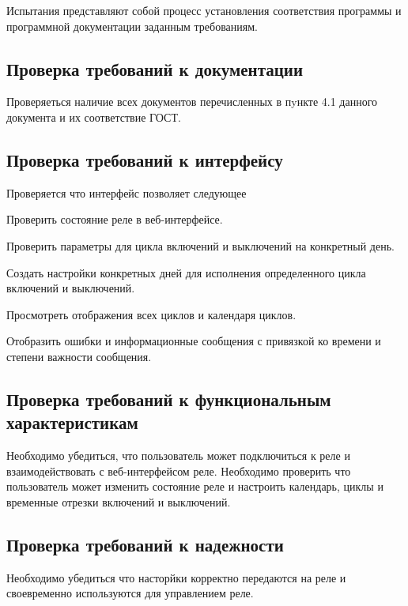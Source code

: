 Испытания представляют собой процесс установления соответствия программы и
программной документации заданным требованиям.

\subsection{Проверка требований к документации}
Проверяеться наличие всех документов перечисленных в пyнкте 4.1 данного документа и их соответствие ГОСТ.

\subsection{Проверка требований к интерфейсу}
Проверяется что интерфейс позволяет следующее
\begin{my_enumerate}
\item Проверить состояние реле в веб-интерфейсе.
\item Проверить параметры для цикла включений и выключений на конкретный день.
\item Создать настройки конкретных дней для исполнения определенного цикла включений и выключений.
\item Просмотреть отображения всех циклов и календаря циклов.
\item Отобразить ошибки и информационные сообщения с привязкой ко времени и степени важности сообщения.
\end{my_enumerate}


\subsection{Проверка требований к функциональным характеристикам}
Необходимо убедиться, что пользователь может подключиться к реле и взаимодействовать с веб-интерфейсом реле. Необходимо проверить что пользователь может изменить состояние реле и настроить календарь, циклы и временные отрезки включений и выключений.


\subsection{Проверка требований к надежности}
Необходимо убедиться что насторйки корректно передаются на реле и своевременно используются для управлением реле.